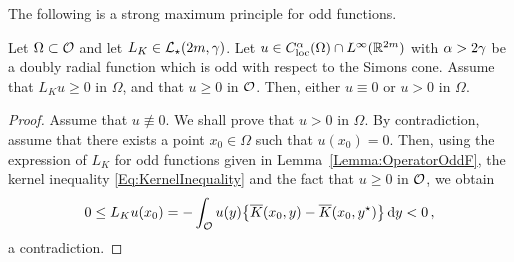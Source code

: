 The following is a strong maximum principle for odd functions.

\begin{proposition}
\label{Prop:StrongMaximumPrincipleForOddFunctions} Let $\Omega \subset \mathcal{O}$ and let $L_K  \in \mathcal{L}_\star (2m,  \gamma)$.  Let $u\in C^{\alpha}_{\mathrm{loc}}(\Omega)\cap L^\infty(\mathbb{R}^{2m})$ with $\alpha > 2\gamma$ be a doubly radial function which is odd with respect to the Simons cone. Assume that $L_K u \geq 0$ in $\Omega$, and that $u\geq 0$ in $\mathcal{O}$. Then, either $u\equiv 0$ or $u > 0$ in $\Omega$.
\end{proposition}

\begin{proof}
Assume that $u \not \equiv 0$. We shall prove that $u > 0$ in $\Omega$. By contradiction, assume that there exists a point $x_0\in \Omega$ such that $u(x_0)= 0$. Then, using the expression of $L_K $ for odd functions given in Lemma~\ref{Lemma:OperatorOddF}, the kernel inequality \eqref{Eq:KernelInequality} and the fact that $u\geq 0$ in $\mathcal{O}$, we obtain
$$
0 \leq L_K u(x_0) = - \int_{\mathcal{O}} u(y)\big \{\overline{K}(x_0, y) - \overline{K}(x_0, y^\star) \big \}\,\mathrm{d} y < 0\,,
$$
a contradiction.
\end{proof}



